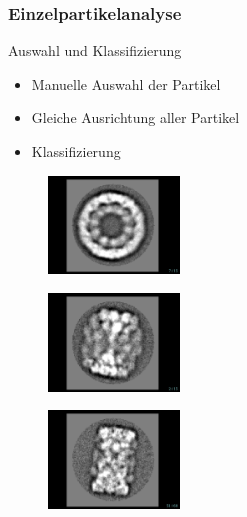 \begin{frame}
	\frametitle{Einzelpartikelanalyse}
	\begin{block}{Auswahl und Klassifizierung}
		\begin{itemize}
			\item Manuelle Auswahl der Partikel
			\item Gleiche Ausrichtung aller Partikel
			\item Klassifizierung
		\end{itemize}
	\end{block}
	\centering
	\begin{minipage}{3.5cm}
		\begin{figure}
			\includegraphics[width = 3.5cm]{pic/k_c_1.png}
		\end{figure}
	\end{minipage}
	\begin{minipage}{3.5cm}
		\begin{figure}
			\includegraphics[width = 3.5cm]{pic/k_c_2.png}
		\end{figure}
	\end{minipage}
	\begin{minipage}{3.5cm}
		\begin{figure}
			\includegraphics[width = 3.5cm]{pic/k_c_3.png}
		\end{figure}
	\end{minipage}
\end{frame}

